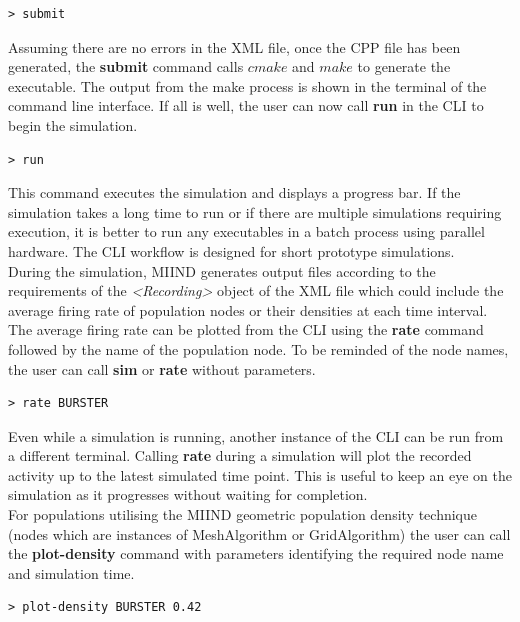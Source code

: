 \documentclass[utf8]{frontiersSCNS} %
\begin{document}
\begin{lstlisting}[language=xml]
> submit
\end{lstlisting}

Assuming there are no errors in the XML file, once the CPP file has been generated, the \textbf{submit} command calls $cmake$ and $make$ to generate the executable. The output from the make process is shown in the terminal of the command line interface. If all is well, the user can now call \textbf{run} in the CLI to begin the simulation.

\begin{lstlisting}[language=xml]
> run
\end{lstlisting}

This command executes the simulation and displays a progress bar. If the simulation takes a long time to run or if there are multiple simulations requiring execution, it is better to run any executables in a batch process using parallel hardware. The CLI workflow is designed for short prototype simulations. \\
During the simulation, MIIND generates output files according to the requirements of the \textit{\textless Recording\textgreater} object of the XML file which could include the average firing rate of population nodes or their densities at each time interval. The average firing rate can be plotted from the CLI using the \textbf{rate} command followed by the name of the population node. To be reminded of the node names, the user can call \textbf{sim} or \textbf{rate} without parameters.\\

\begin{lstlisting}[language=xml]
> rate BURSTER
\end{lstlisting}

Even while a simulation is running, another instance of the CLI can be run from a different terminal. Calling \textbf{rate} during a simulation will plot the recorded activity up to the latest simulated time point. This is useful to keep an eye on the simulation as it progresses without waiting for completion.\\
For populations utilising the MIIND geometric population density technique (nodes which are instances of MeshAlgorithm or GridAlgorithm) the user can call the \textbf{plot-density} command with parameters identifying the required node name and simulation time. \\

\begin{lstlisting}[language=xml]
> plot-density BURSTER 0.42
\end{lstlisting}
\end{document}
